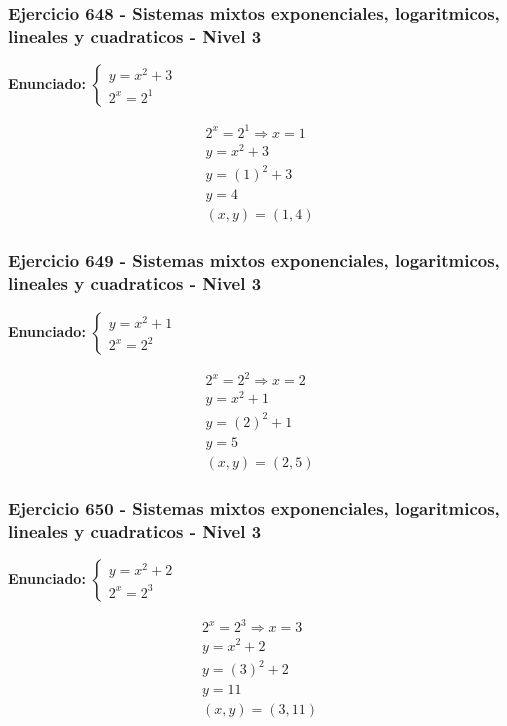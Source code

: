 \documentclass[12pt,a4paper]{article}
\begin{document}
\subsubsection*{Ejercicio 648 - Sistemas mixtos exponenciales, logaritmicos, lineales y cuadraticos - Nivel 3}
\textbf{Enunciado:} \(\begin{cases} y=x^2+3\\ 2^x=2^{1}\end{cases}\)

\[
\begin{aligned}
2^x=2^{1}\Rightarrow x=1\\
y=x^2+3\\
y=(1)^2+3\\
y=4\\
\boxed{(x,y)=(1,4)}
\end{aligned}
\]


\subsubsection*{Ejercicio 649 - Sistemas mixtos exponenciales, logaritmicos, lineales y cuadraticos - Nivel 3}
\textbf{Enunciado:} \(\begin{cases} y=x^2+1\\ 2^x=2^{2}\end{cases}\)

\[
\begin{aligned}
2^x=2^{2}\Rightarrow x=2\\
y=x^2+1\\
y=(2)^2+1\\
y=5\\
\boxed{(x,y)=(2,5)}
\end{aligned}
\]


\subsubsection*{Ejercicio 650 - Sistemas mixtos exponenciales, logaritmicos, lineales y cuadraticos - Nivel 3}
\textbf{Enunciado:} \(\begin{cases} y=x^2+2\\ 2^x=2^{3}\end{cases}\)

\[
\begin{aligned}
2^x=2^{3}\Rightarrow x=3\\
y=x^2+2\\
y=(3)^2+2\\
y=11\\
\boxed{(x,y)=(3,11)}
\end{aligned}
\]
\end{document}

